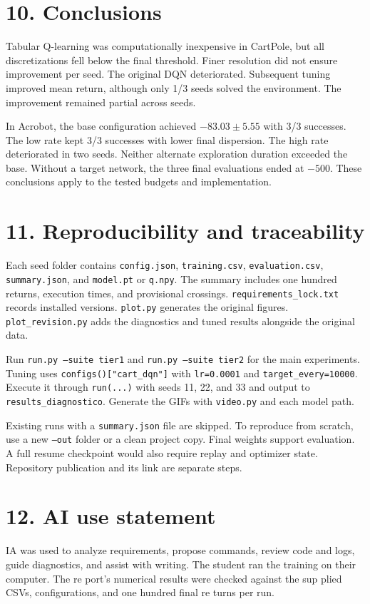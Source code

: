 \documentclass[10pt,a4paper,twocolumn]{extarticle}
\begin{document}
\clearpage
\section*{10. Conclusions}
Tabular Q-learning was computationally inexpensive in CartPole, but all discretizations fell below the final threshold. Finer resolution did not ensure improvement per seed. The original DQN deteriorated. Subsequent tuning improved mean return, although only 1/3 seeds solved the environment. The improvement remained partial across seeds.

In Acrobot, the base configuration achieved $-83.03\pm5.55$ with 3/3 successes. The low rate kept 3/3 successes with lower final dispersion. The high rate deteriorated in two seeds. Neither alternate exploration duration exceeded the base. Without a target network, the three final evaluations ended at $-500$. These conclusions apply to the tested budgets and implementation.

\section*{11. Reproducibility and traceability}
Each seed folder contains \texttt{config.json}, \texttt{training.csv}, \texttt{evaluation.csv}, \texttt{summary.json}, and \texttt{model.pt} or \texttt{q.npy}. The summary includes one hundred returns, execution times, and provisional crossings. \texttt{requirements\_lock.txt} records installed versions. \texttt{plot.py} generates the original figures. \texttt{plot\_revision.py} adds the diagnostics and tuned results alongside the original data.

Run \texttt{run.py --suite tier1} and \texttt{run.py --suite tier2} for the main experiments. Tuning uses \texttt{configs()["cart\_dqn"]} with \texttt{lr=0.0001} and \texttt{target\_every=10000}. Execute it through \texttt{run(...)} with seeds 11, 22, and 33 and output to \texttt{results\_diagnostico}. Generate the GIFs with \texttt{video.py} and each model path.

Existing runs with a \texttt{summary.json} file are skipped. To reproduce from scratch, use a new \texttt{--out} folder or a clean project copy. Final weights support evaluation. A full resume checkpoint would also require replay and optimizer state. Repository publication and its link are separate steps.

\section*{12. AI use statement}
IA was used to analyze requirements, propose commands, review code and logs, guide
diagnostics, and assist with writing. The
student ran the training on their computer. The re
port’s numerical results were checked against the sup
plied CSVs, configurations, and one hundred final re
turns per run. 
\end{document}
